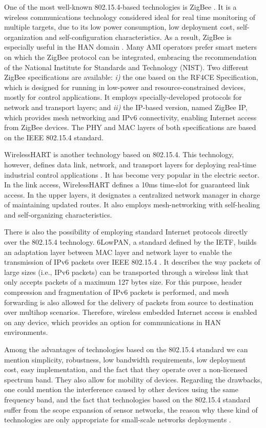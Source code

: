 \documentclass[11pt,draftclsnofoot,onecolumn]{IEEEtran}
\begin{document}
One of the most well-known 802.15.4-based technologies is ZigBee \cite{Alliance2010}. It is a wireless communications technology considered ideal for real time monitoring of multiple targets, due to its low power consumption, low deployment cost, self-organization and self-configuration characteristics. As a result, ZigBee is especially useful in the HAN domain \cite{Sabbah2014}. Many AMI operators prefer smart meters on which the ZigBee protocol can be integrated, embracing the recommendation of the National Institute for Standards and Technology (NIST). Two different ZigBee specifications are available: \textit{i)} the one based on the RF4CE Specification, which is designed for running in low-power and resource-constrained devices, mostly for control applications. It employs specially-developed protocols for network and transport layers; and \textit{ii)} the IP-based version, named ZigBee IP, which provides mesh networking and IPv6 connectivity, enabling Internet access from ZigBee devices. The PHY and MAC layers of both specifications are based on the IEEE 802.15.4 standard.  

WirelessHART is another technology based on 802.15.4. This technology, however, defines data link, network, and transport layers for deploying real-time industrial control applications \cite{Song2008}. It has become very popular in the electric sector. In the link access, WirelessHART defines a 10ms time-slot for guaranteed link access. In the upper layers, it designates a centralized network manager in charge of maintaining updated routes. It also employs mesh-networking with self-healing and self-organizing characteristics.

There is also the possibility of employing standard Internet protocols directly over the 802.15.4 technology. 6LowPAN, a standard defined by the IETF, builds an adaptation layer between MAC layer and network layer to enable the transmission of IPv6 packets over IEEE 802.15.4 \cite{RFC 4944}.  It describes the way packets of large sizes (i.e., IPv6 packets) can be transported through a wireless link that only accepts packets of a maximum 127 bytes size. For this purpose, header compression and fragmentation of IPv6 packets is performed, and mesh forwarding is also allowed for the delivery of packets from source to destination over multihop scenarios. Therefore, wireless embedded Internet access is enabled on any device, which provides an option for communications in HAN environments.
 
Among the advantages of technologies based on the 802.15.4 standard we can mention simplicity, robustness, low bandwidth requirements, low deployment cost, easy implementation, and the fact that they operate over a non-licensed spectrum band. They also allow for mobility of  devices. Regarding the drawbacks, one could mention the interference caused by other devices using the same frequency band, and the fact that technologies based on the 802.15.4 standard suffer from the scope expansion of sensor networks, the reason why these kind of technologies are only appropriate for small-scale networks deployments  \cite{Lu2011}.
 
\end{document}
